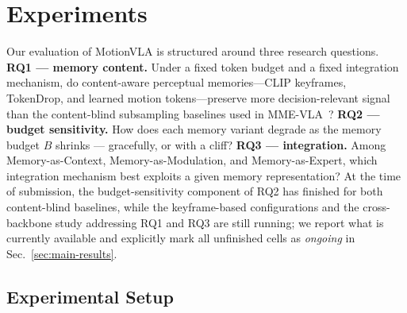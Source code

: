 \documentclass{article}
\begin{document}


\section{Experiments}
\label{sec:exp}

Our evaluation of MotionVLA is structured around three research questions.
\textbf{RQ1 --- memory content.} Under a fixed token budget and a fixed
integration mechanism, do content-aware perceptual memories---CLIP keyframes,
TokenDrop, and learned motion tokens---preserve more decision-relevant signal
than the content-blind subsampling baselines used in
MME-VLA~\citep{dai2026robomme}?
\textbf{RQ2 --- budget sensitivity.} How does each memory variant degrade as
the memory budget $B$ shrinks --- gracefully, or with a cliff?
\textbf{RQ3 --- integration.} Among Memory-as-Context, Memory-as-Modulation,
and Memory-as-Expert, which integration mechanism best exploits a given
memory representation?
At the time of submission, the budget-sensitivity component of RQ2 has
finished for both content-blind baselines, while the keyframe-based
configurations and the cross-backbone study addressing RQ1 and RQ3 are
still running; we report what is currently available and explicitly mark
all unfinished cells as \emph{ongoing} in Sec.~\ref{sec:main-results}.

\subsection{Experimental Setup}
\label{sec:setup}
\end{document}

